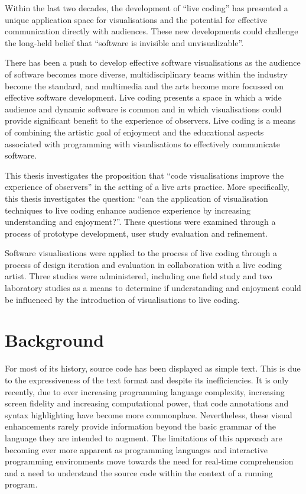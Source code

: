 Within the last two decades, the development of ``live coding'' has presented a unique application space for visualisations and the potential for effective communication directly with audiences. These new developments could challenge the long-held belief that ``software is invisible and unvisualizable''.


There has been a push to develop effective software visualisations as the audience of software becomes more diverse, multidisciplinary teams within the industry become the standard, and multimedia and the arts become more focussed on effective software development. Live coding presents a space in which a wide audience and dynamic software is common and in which visualisations could provide significant benefit to the experience of observers. Live coding is a means of combining the artistic goal of enjoyment and the educational aspects associated with programming with visualisations to effectively communicate software.

This thesis investigates the proposition that ``code visualisations improve the experience of observers'' in the setting of a live arts practice. More specifically, this thesis investigates the question: ``can the application of visualisation techniques to live coding enhance audience experience by increasing understanding and enjoyment?''. These questions were examined through a process of prototype development, user study evaluation and refinement.

Software visualisations were applied to the process of live coding through a process of design iteration and evaluation in collaboration with a live coding artist. Three studies were administered, including one field study and two laboratory studies as a means to determine if understanding and enjoyment could be influenced by the introduction of visualisations to live coding.

\section{Background}

For most of its history, source code has been displayed as simple text. This is due to the expressiveness of the text format and despite its inefficiencies. 
It is only recently, due to ever increasing programming language complexity, increasing screen fidelity and increasing computational power, that code annotations and syntax highlighting have become more commonplace. Nevertheless, these visual enhancements rarely provide information beyond the basic grammar of the language they are intended to augment. The limitations of this approach are becoming ever more apparent as programming languages and interactive programming environments move towards the need for real-time comprehension and a need to understand the source code within the context of a running program.

